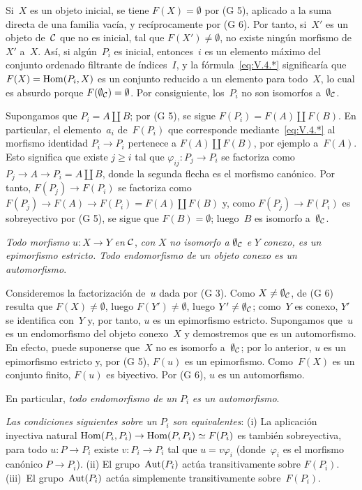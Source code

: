 \begin{enumerateb}
Si~$X$ es un objeto inicial, se tiene $F(X)=\emptyset$ por (G 5), aplicado a
la suma directa de una familia vacía, y recíprocamente por (G 6). Por tanto,
si~$X'$ es un objeto de~$\cal{C}$ que no es inicial, \ie tal que
$F(X')\neq\emptyset$, no existe ningún morfismo de~$X'$ a~$X$. Así, si
algún~$P_i$ es inicial, entonces~$i$ es un elemento máximo del conjunto
ordenado filtrante de índices~$I$, y la fórmula~\eqref{eq:V.4.*}
significaría que $F(X)=\Hom(P_i,X)$ es un conjunto reducido a un elemento
para todo~$X$, lo cual es absurdo porque
$F(\emptyset_{\cal{C}})=\emptyset$. Por consiguiente, los~$P_i$ no son
isomorfos a~$\emptyset_{\cal{C}}$.

Supongamos que $P_i=A\amalg B$; por (G 5), se sigue
$F(P_i)=F(A)\amalg F(B)$. En particular, el elemento~$a_i$ de~$F(P_i)$ que
corresponde mediante~\eqref{eq:V.4.*} al morfismo identidad
$P_i\to P_i$ pertenece a $F(A)\amalg F(B)$, por ejemplo a~$F(A)$. Esto
significa que existe $j\geq i$ tal que
$\varphi_{ij}\colon P_j\to P_i$ se factoriza como
$P_j\to A\to P_i=A\amalg B$, donde la segunda flecha es el morfismo
canónico. Por tanto, $F(P_j)\to F(P_i)$ se factoriza como
$F(P_j)\to F(A)\to F(P_i)=F(A)\amalg F(B)$ y, como
$F(P_j)\to F(P_i)$ es sobreyectivo por (G 5), se sigue que
$F(B)=\emptyset$; luego~$B$ es isomorfo a~$\emptyset_{\cal{C}}$.

\item[e)]
\emph{Todo morfismo} $u\colon X\to Y$ \emph{en} $\cal{C}$, \emph{con} $X$
\emph{no isomorfo a} $\emptyset_{\cal{C}}$ \emph{e} $Y$ \emph{conexo, es
un epimorfismo estricto. Todo endomorfismo de un objeto conexo es un
automorfismo}.

Consideremos la factorización de~$u$ dada por (G 3). Como
$X\neq\emptyset_{\cal{C}}$, de (G 6) resulta que
$F(X)\neq\emptyset$, luego $F(Y')\neq\emptyset$, luego
$Y'\neq\emptyset_{\cal{C}}$; como~$Y$ es conexo, $Y'$ se identifica con~$Y$
y, por tanto, $u$ es un epimorfismo estricto. Supongamos que~$u$ es un
endomorfismo del objeto conexo~$X$ y demostremos que es un automorfismo. En
efecto, puede suponerse que~$X$ no es isomorfo a~$\emptyset_{\cal{C}}$; por
lo anterior, $u$ es un epimorfismo estricto y, por (G 5), $F(u)$ es un
epimorfismo. Como~$F(X)$ es un conjunto finito, $F(u)$ es biyectivo. Por
(G 6), $u$ es un automorfismo.

En particular, \emph{todo endomorfismo de un} $P_i$ \emph{es un
automorfismo}.

\item[f)] \emph{Las condiciones siguientes sobre un} $P_i$ \emph{son
equivalentes}: (i) La aplicación inyectiva natural
$\Hom(P_i,P_i)\to\Hom(P,P_i)\simeq F(P_i)$ es también sobreyectiva, \ie para
todo $u\colon P\to P_i$ existe $v\colon P_i\to P_i$ tal que
$u=v\varphi_i$ (donde~$\varphi_i$ es el morfismo canónico
$P\to P_i$). (ii) El grupo~$\Aut(P_i)$ actúa transitivamente sobre
$F(P_i)$. (iii)~El grupo~$\Aut(P_i)$ actúa simplemente transitivamente
sobre~$F(P_i)$.


\end{enumerateb}

